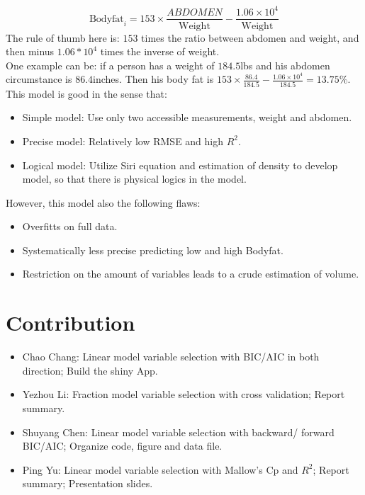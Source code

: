 \documentclass[11pt, twocolumn]{article}
\begin{document}
$$\text{Bodyfat}_i = 153 \times \frac{ABDOMEN}{ \text{Weight} }
				 - \frac{1.06 \times 10^4}{ \text{Weight} }$$
The rule of thumb here is: $153$ times the ratio between abdomen and weight, and then minus $1.06*10^4$ times the inverse of weight.\\
One example can be: if a person has a weight of $184.5$lbs and his abdomen circumstance is $86.4$inches. Then his body fat is $153 \times \frac{86.4}{184.5} - \frac{1.06\times 10^4}{184.5}=13.75\%$.\\
This model is good in the sense that: 
\begin{itemize}
	\item Simple model: Use only two accessible measurements, weight and abdomen. 
	\item Precise model: Relatively low RMSE and high $R^2$.
	\item Logical model: Utilize Siri equation and estimation of density to develop model, so that there is physical logics in the model. 
\end{itemize}

However, this model also the following flaws: 

\begin{itemize}
	\item Overfitts on full data. 
	\item Systematically less precise predicting low and high Bodyfat. 
	\item Restriction on the amount of variables leads to a crude estimation of volume. 
\end{itemize}




\section{Contribution}

\begin{itemize}
	\item Chao Chang: Linear model variable selection with BIC/AIC in both direction; Build the shiny App.
	\item Yezhou Li: Fraction model variable selection with cross validation; Report summary.
	\item Shuyang Chen: Linear model variable selection with backward/ forward BIC/AIC; Organize code, figure and data file.
	\item Ping Yu: Linear model variable selection with Mallow's Cp and $R^2$; Report summary; Presentation slides.
\end{itemize}
\end{document}
